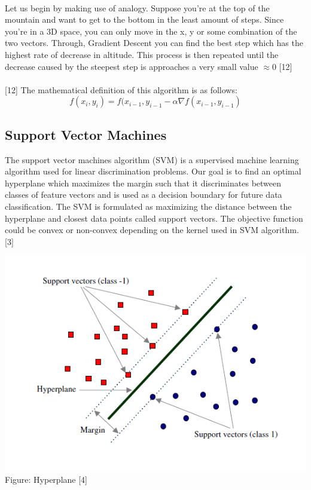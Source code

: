 \documentclass[hidelinks,12pt]{article}
\begin{document}
	\paragraph{}
	Let us begin by making use of analogy. Suppose you're at the top of the mountain and want to get to the bottom in the least amount of steps. Since you're in a 3D space, you can only move in the x, y or some combination of the two vectors. Through, Gradient Descent you can find the best step which has the highest rate of decrease in altitude. This process is then repeated until the decrease caused by the steepest step is approaches a very small value $\approx 0$ [12]
	\paragraph{}
	[12] The mathematical definition of this algorithm is as follows:  
	$$f(x_i, y_i) = f(x_{i-1}, y_{i-1} - \alpha\nabla f(x_{i-1}, y_{i-1})$$


\subsection{Support Vector Machines}
	The support vector machines algorithm (SVM) is a supervised machine learning algorithm used for linear discrimination problems. Our goal is to find an optimal hyperplane which maximizes the margin such that it discriminates between classes of feature vectors and is used as a decision boundary for future data classification. The SVM is formulated as maximizing
	the distance between the hyperplane and closest data points called support vectors. The objective function could be convex or non-convex depending on the kernel used in SVM algorithm.[3]

	\begin{center}
	    \includegraphics[scale = 0.7]{images/hyperplane.png}
	    Figure: Hyperplane [4]
	\end{center}
\end{document}
